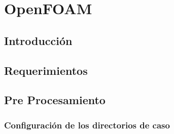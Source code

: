 \chapter{OpenFOAM}

\section{Introducción} %

\section{Requerimientos} %

\section{Pre Procesamiento}




%
%
%
%
	\subsection{Configuración de los directorios de caso}
